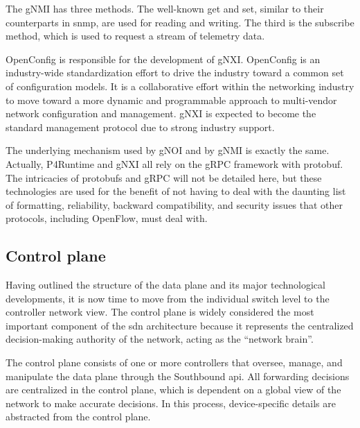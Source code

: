 The gNMI has three methods. The well-known get and set, similar to their counterparts in \gls{snmp}, are used for reading and writing. The third is the subscribe method, which is used to request a stream of telemetry data\cite{peterson_software-defined_2021}.

OpenConfig\cite{noauthor_openconfig_nodate} is responsible for the development of gNXI. OpenConfig is an industry-wide standardization effort to drive the industry toward a common set of configuration models. It is a collaborative effort within the networking industry to move toward a more dynamic and programmable approach to multi-vendor network configuration and management. gNXI is expected to become the standard management protocol due to strong industry support\cite{peterson_software-defined_2021}.

The underlying mechanism used by gNOI and by gNMI is exactly the same\cite{peterson_software-defined_2021}. Actually, P4Runtime and gNXI all rely on the gRPC framework with protobuf\cite{hauser_survey_2021}. The intricacies of protobufs and gRPC will not be detailed here, but these technologies are used for the benefit of not having to deal with the daunting list of formatting, reliability, backward compatibility, and security issues that other protocols, including OpenFlow, must deal with\cite{peterson_software-defined_2021}.

   
\subsection{Control plane} %
\label{subsec:control_plane}

Having outlined the structure of the data plane and its major technological developments, it is now time to move from the individual switch level to the controller network view. The control plane is widely considered the most important component of the \gls{sdn} architecture\cite{xia_survey_2015} because it represents the centralized decision-making authority of the network, acting as the “network brain”\cite{kreutz_software-defined_2015}.

The control plane consists of one or more controllers that oversee, manage, and manipulate the data plane through the Southbound \gls{api}. All forwarding decisions are centralized in the control plane, which is dependent on a global view of the network to make accurate decisions. In this process, device-specific details are abstracted from the control plane\cite{latif_comprehensive_2020}. 

